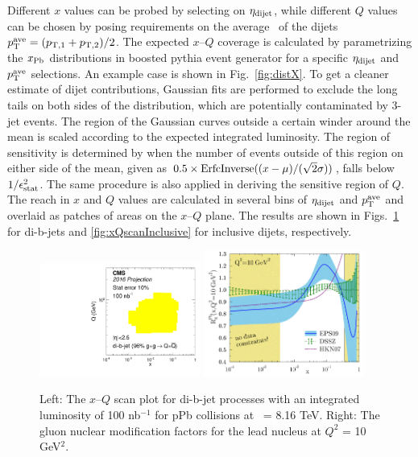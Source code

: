 Different $x$ values can be probed by selecting on $\eta_{\rm dijet}$, 
while different $Q$ values can be chosen by posing requirements 
on the average \pt\ of the dijets $p_\mathrm{T}^{\rm ave} = (p_{\rm T,1} + p_{\rm T,2})/2$.
The expected $x$--$Q$ coverage is calculated by parametrizing 
the $x_{\rm Pb}$ distributions in boosted {\sc pythia} event generator
for a specific $\eta_{\rm dijet}$ and $p_\mathrm{T}^{\rm ave}$ selections. 
An example case is shown in Fig.~\ref{fig:distX}. To get a cleaner
estimate of dijet contributions, Gaussian fits are performed 
to exclude the long tails on both sides of the distribution, which are 
potentially contaminated by 3-jet events. The region of the Gaussian
curves outside a certain winder around the mean is scaled
according to the expected integrated luminosity. The region of sensitivity is determined 
by when the number of events outside of this region on either side of 
the mean, given as $0.5 \times {\rm ErfcInverse}((x-\mu)/(\sqrt{2}\sigma))$, 
falls below $1/\epsilon_{\rm stat}^{2}$. The same procedure is also applied 
in deriving the sensitive region of $Q$. The reach in $x$ and $Q$ values 
are calculated in several bins of $\eta_{\rm dijet}$ and $p_\mathrm{T}^{\rm ave}$ 
and overlaid as patches of areas on the $x$--$Q$ plane. The results are shown 
in Figs.~\ref{fig:xQscanBjet} for di-b-jets and \ref{fig:xQscanInclusive} 
for inclusive dijets, respectively.


\begin{figure}[h]
\begin{center}
\includegraphics[width= 0.47\textwidth]{figures/filledQX_Lumi100_BJet.pdf}
\includegraphics[width= 0.47\textwidth]{figures/eps09_10GeV_Gluon_nPDF.png}
\caption{Left: The $x$--$Q$ scan plot for di-b-jet processes 
with an integrated luminosity of 100 nb$^{-1}$ for pPb collisions
at \rootsNN\ = 8.16 TeV. Right: The gluon nuclear modification factors 
for the lead nucleus at $Q^{2}$ = 10 GeV$^{2}$.}
\label{fig:xQscanBjet}
\end{center}
\end{figure}

